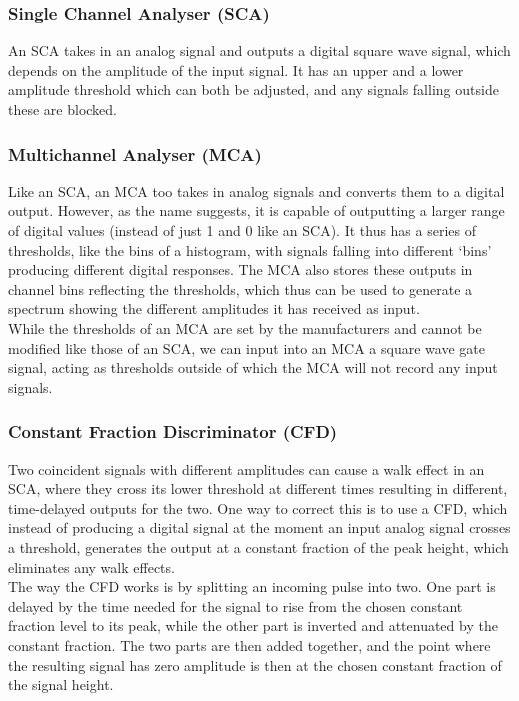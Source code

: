\subsubsection{Single Channel Analyser (SCA)}

An SCA takes in an analog signal and outputs a digital square wave signal, which depends on the amplitude of the input signal. It has an upper and a lower amplitude threshold which can both be adjusted, and any signals falling outside these are blocked.\\

\subsubsection{Multichannel Analyser (MCA)}

Like an SCA, an MCA too takes in analog signals and converts them to a digital output. However, as the name suggests, it is capable of outputting a larger range of digital values (instead of just 1 and 0 like an SCA). It thus has a series of thresholds, like the bins of a histogram, with signals falling into different `bins' producing different digital responses. The MCA also stores these outputs in channel bins reflecting the thresholds, which thus can be used to generate a spectrum showing the different amplitudes it has received as input.\\

While the thresholds of an MCA are set by the manufacturers and cannot be modified like those of an SCA, we can input into an MCA a square wave gate signal, acting as thresholds outside of which the MCA will not record any input signals.\\

\subsubsection{Constant Fraction Discriminator (CFD)}

Two coincident signals with different amplitudes can cause a walk effect in an SCA, where they cross its lower threshold at different times resulting in different, time-delayed outputs for the two. One way to correct this is to use a CFD, which instead of producing a digital signal at the moment an input analog signal crosses a threshold, generates the output at a constant fraction of the peak height, which eliminates any walk effects.\\

The way the CFD works is by splitting an incoming pulse into two. One part is delayed by the time needed for the signal to rise from the chosen constant fraction level to its peak, while the other part is inverted and attenuated by the constant fraction. The two parts are then added together, and the point where the resulting signal has zero amplitude is then at the chosen constant fraction of the signal height.\\


